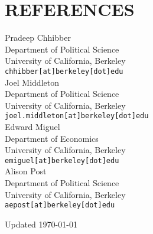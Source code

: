 \documentclass[11pt]{article}
\begin{document}
\vspace{3mm}
\section*{REFERENCES}
\vspace{3mm}
\begin{minipage}[t]{0.5\textwidth}
Pradeep Chhibber\\
Department of Political Science\\
 University of California, Berkeley\\
\texttt{chhibber[at]berkeley[dot]edu}\\

Joel Middleton\\
Department of Political Science\\
University of California, Berkeley\\
\texttt{joel.middleton[at]berkeley[dot]edu}\\

Edward Miguel\\
Department of Economics\\
University of California, Berkeley\\
\texttt{emiguel[at]berkeley[dot]edu}\\

Alison Post\\
Department of Political Science\\
 University of California, Berkeley\\
\texttt{aepost[at]berkeley[dot]edu}\\

\end{minipage}






\vspace*{\fill}

Updated \today
\end{document}
